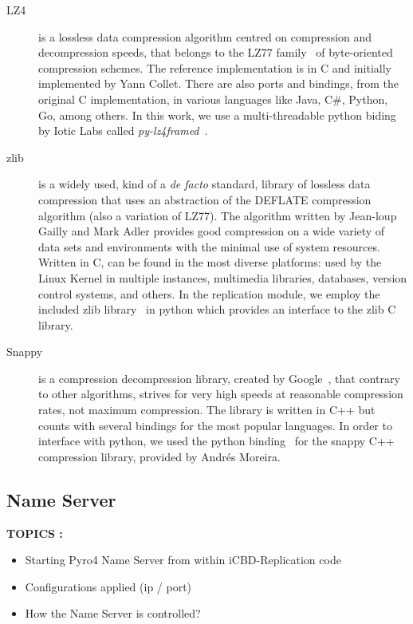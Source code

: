 \begin{description}
	\item [LZ4] is a lossless data compression algorithm centred on compression and decompression speeds, that belongs to the LZ77 family~\cite{lz77} of byte-oriented compression schemes. The reference implementation is in C and initially implemented by Yann Collet. There are also ports and bindings, from the original C implementation, in various languages like Java, C\#, Python, Go, among others. In this work, we use a multi-threadable python biding by Iotic Labs called \textit{py-lz4framed}~\cite{lz4framed}.
	\item [zlib] is a widely used, kind of a \textit{de facto} standard, library of lossless data compression that uses an abstraction of the DEFLATE compression algorithm (also a variation of LZ77). The algorithm written by Jean-loup Gailly and Mark Adler provides good compression on a wide variety of data sets and environments with the minimal use of system resources.~\cite{zlib} Written in C, can be found in the most diverse platforms: used by the Linux Kernel in multiple instances, multimedia libraries, databases, version control systems, and others. In the replication module, we employ the included zlib library~\cite{py_zlib} in python which provides an interface to the zlib C library.
	\item [Snappy] is a compression \/ decompression library, created by Google~\cite{snappy}, that contrary to other algorithms, strives for very high speeds at reasonable compression rates, not maximum compression. The library is written in C++ but counts with several bindings for the most popular languages. In order to interface with python, we used the python binding~\cite{py_snappy} for the snappy C++ compression library, provided by Andrés Moreira.
\end{description}

\subsection{Name Server}
\label{sub:rep_name_server}

\textbf{TOPICS :}
\begin{itemize}
	\item Starting Pyro4 Name Server from within iCBD-Replication code
	\item Configurations applied (ip / port)
	\item How the Name Server is controlled?
\end{itemize}


